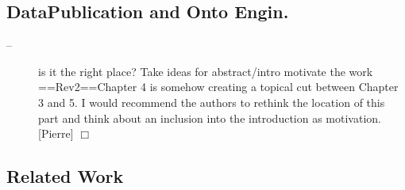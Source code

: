 \documentclass[a4paper,notitlepage]{article}
\newcommand\todo[2]{\item[--] #1 \hfill[#2] $\Box$}%
\begin{document}
\subsection{DataPublication and Onto Engin.}
\begin{description}
\todo{is it the right place? Take ideas for abstract/intro motivate the work \\
==Rev2==Chapter 4 is somehow creating a topical cut between Chapter 3 and 5. I would recommend the authors to rethink the location of this part and think about an inclusion into the introduction as motivation.}{Pierre}
\end{description}

\subsection{Related Work}
\end{document}
